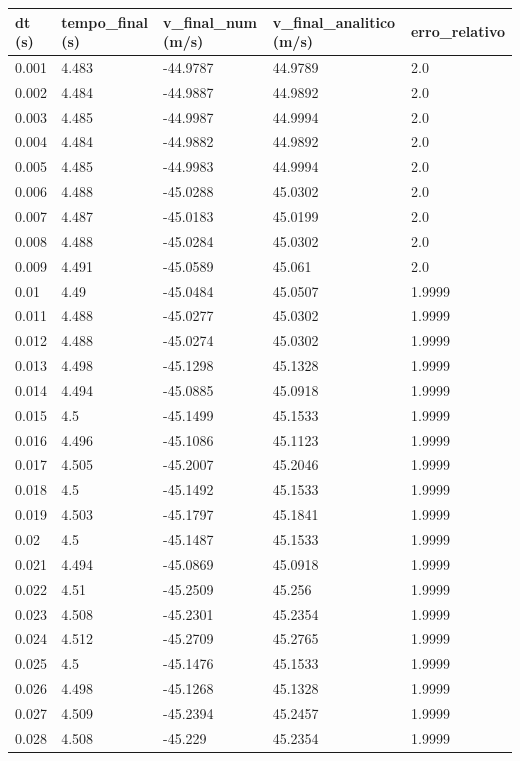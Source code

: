 \begin{tabular}{lllll}
\toprule
dt (s) & tempo\_final (s) & v\_final\_num (m/s) & v\_final\_analitico (m/s) & erro\_relativo \\
\midrule
0.001 & 4.483 & -44.9787 & 44.9789 & 2.0 \\
0.002 & 4.484 & -44.9887 & 44.9892 & 2.0 \\
0.003 & 4.485 & -44.9987 & 44.9994 & 2.0 \\
0.004 & 4.484 & -44.9882 & 44.9892 & 2.0 \\
0.005 & 4.485 & -44.9983 & 44.9994 & 2.0 \\
0.006 & 4.488 & -45.0288 & 45.0302 & 2.0 \\
0.007 & 4.487 & -45.0183 & 45.0199 & 2.0 \\
0.008 & 4.488 & -45.0284 & 45.0302 & 2.0 \\
0.009 & 4.491 & -45.0589 & 45.061 & 2.0 \\
0.01 & 4.49 & -45.0484 & 45.0507 & 1.9999 \\
0.011 & 4.488 & -45.0277 & 45.0302 & 1.9999 \\
0.012 & 4.488 & -45.0274 & 45.0302 & 1.9999 \\
0.013 & 4.498 & -45.1298 & 45.1328 & 1.9999 \\
0.014 & 4.494 & -45.0885 & 45.0918 & 1.9999 \\
0.015 & 4.5 & -45.1499 & 45.1533 & 1.9999 \\
0.016 & 4.496 & -45.1086 & 45.1123 & 1.9999 \\
0.017 & 4.505 & -45.2007 & 45.2046 & 1.9999 \\
0.018 & 4.5 & -45.1492 & 45.1533 & 1.9999 \\
0.019 & 4.503 & -45.1797 & 45.1841 & 1.9999 \\
0.02 & 4.5 & -45.1487 & 45.1533 & 1.9999 \\
0.021 & 4.494 & -45.0869 & 45.0918 & 1.9999 \\
0.022 & 4.51 & -45.2509 & 45.256 & 1.9999 \\
0.023 & 4.508 & -45.2301 & 45.2354 & 1.9999 \\
0.024 & 4.512 & -45.2709 & 45.2765 & 1.9999 \\
0.025 & 4.5 & -45.1476 & 45.1533 & 1.9999 \\
0.026 & 4.498 & -45.1268 & 45.1328 & 1.9999 \\
0.027 & 4.509 & -45.2394 & 45.2457 & 1.9999 \\
0.028 & 4.508 & -45.229 & 45.2354 & 1.9999 \\

\end{tabular}
